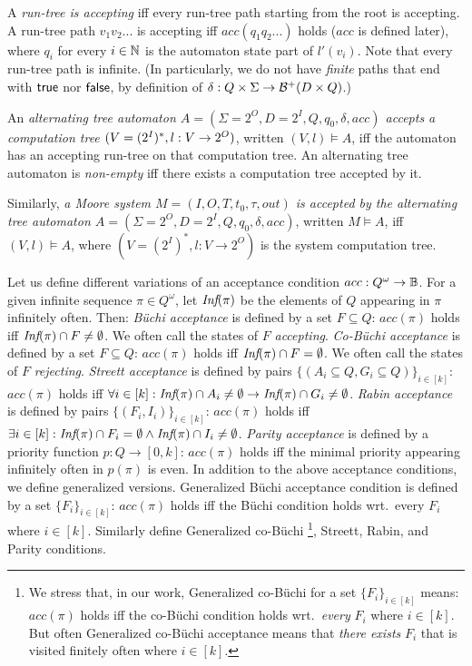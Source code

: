 A \emph{run-tree is accepting}
iff every run-tree path starting from the root is accepting.
A run-tree path $v_1 v_2 ...$ is accepting
iff $acc(q_1q_2...)$ holds ($acc$ is defined later),
where $q_i$ for every $i\in \mathbb{N}$ is the automaton state part of $l'(v_i)$.
Note that every run-tree path is infinite.
(In particularly, we do not have \emph{finite} paths that end with $\textsf{true}$ nor $\textsf{false}$,
 by definition of $\delta:Q\times\Sigma\to{\cal B}^+(D\times Q)$.)

An \emph{alternating tree automaton $A=(\Sigma=2^O, D=2^I, Q, q_0, \delta, acc)$
accepts a computation tree $(V=(2^I)^*, l:V \to {2^O})$},
written $(V,l) \models A$,
iff
the automaton has an accepting run-tree on that computation tree.
An alternating tree automaton is \emph{non-empty} iff there exists a computation tree accepted by it.

Similarly,
\emph{a Moore system $M=(I, O, T, t_0, \tau, out)$
is accepted
by the alternating tree automaton $A=(\Sigma=2^O, D=2^I, Q, q_0, \delta, acc)$},
written $M \models A$,
iff $(V,l) \models A$,
where $(V=(2^I)^*,l:V\to 2^O)$ is the system computation tree.

Let us define different variations of an acceptance condition $acc: Q^\omega \to \mathbb{B}$.
For a given infinite sequence $\pi \in Q^\omega$,
let $\textit{Inf}(\pi)$ be the elements of $Q$ appearing in $\pi$ infinitely often.
Then:
\li
\- \emph{B\"uchi acceptance} is defined by a set $F \subseteq Q$:
   $acc(\pi)$ holds iff $\textit{Inf}(\pi) \cap F \neq \emptyset$.
   We often call the states of $F$ \emph{accepting}.
\- \emph{Co-B\"uchi acceptance} is defined by a set $F \subseteq Q$:
   $acc(\pi)$ holds iff $\textit{Inf}(\pi) \cap F = \emptyset$.
   We often call the states of $F$ \emph{rejecting}.
\- \emph{Streett acceptance} is defined by pairs $\{(A_i\subseteq Q,G_i \subseteq Q)\}_{i\in[k]}$:
   $acc(\pi)$ holds
   iff
   $\forall i \in [k]: \textit{Inf}(\pi)\cap A_i \neq \emptyset \rightarrow \textit{Inf}(\pi) \cap G_i\neq\emptyset$.
\- \emph{Rabin acceptance} is defined by pairs $\{(F_i,I_i)\}_{i \in [k]}$:
   $acc(\pi)$ holds
   iff
   $\exists i \in [k]: \textit{Inf}(\pi) \cap F_i = \emptyset \land \textit{Inf}(\pi) \cap I_i \neq \emptyset$.
\- \emph{Parity acceptance} is defined by a priority function
   $p: Q \to [0,k]$:
   $acc(\pi)$ holds iff the minimal priority appearing infinitely often in $p(\pi)$ is even.
\il
In addition to the above acceptance conditions,
we define generalized versions.
Generalized B\"uchi acceptance condition is defined by a set $\{F_i\}_{i \in [k]}$:
$acc(\pi)$ holds iff the B\"uchi condition holds wrt.\ every $F_i$ where $i \in [k]$.
Similarly define Generalized co-B\"uchi%
\footnote{We stress that, in our work, Generalized co-B\"uchi
  for a set $\{F_i\}_{i \in [k]}$ means:
  $acc(\pi)$ holds iff the co-B\"uchi condition holds wrt.\ \emph{every} $F_i$ where $i \in [k]$.
  But often Generalized co-B\"uchi acceptance means that
  \emph{there exists} $F_i$ that is visited finitely often where $i \in [k]$.%
},
Streett, Rabin, and Parity conditions.


